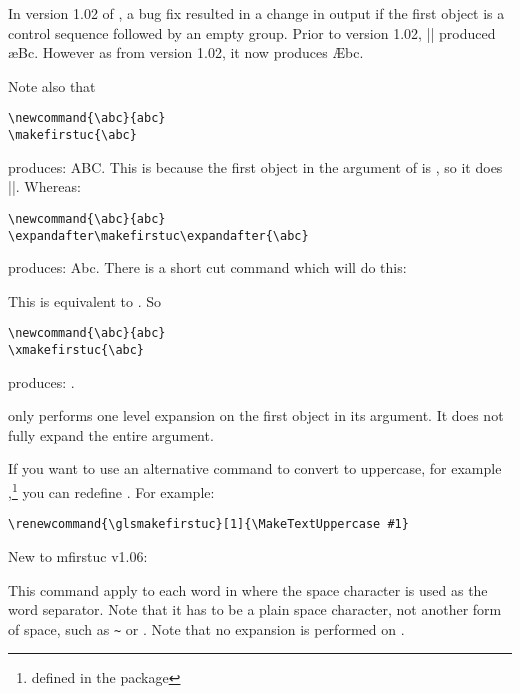 \documentclass{nlctdoc}
\begin{document}
\begin{important}
In version 1.02 of , a bug fix resulted in a change
in output if the first object is a control sequence followed by
an empty group. Prior to version 1.02, ||
produced \ae Bc. However as from version 1.02, it now produces
\AE bc.
\end{important}

Note also that
\begin{verbatim}
\newcommand{\abc}{abc}
\makefirstuc{\abc}
\end{verbatim}
produces: ABC. This is because the first object in the argument of
 is , so it does |\MakeUppercase{\abc}|.
Whereas:
\begin{verbatim}
\newcommand{\abc}{abc}
\expandafter\makefirstuc\expandafter{\abc}
\end{verbatim}
produces: Abc. There is a short cut command which will do this:
\begin{definition}[\DescribeMacro{\xmakefirstuc}]
\end{definition}
This is equivalent to . So
\begin{verbatim}
\newcommand{\abc}{abc}
\xmakefirstuc{\abc}
\end{verbatim}
produces: 
\newcommand{\abc}{abc}%
\xmakefirstuc{\abc}.

\begin{important}
 only performs one level expansion on the first
object in its argument. It does not fully expand the entire
argument.
\end{important}

If you want to use an alternative command to convert to uppercase,
for example ,\footnote{defined in the 
 package} you can redefine . 
For example:
\begin{verbatim}
\renewcommand{\glsmakefirstuc}[1]{\MakeTextUppercase #1}
\end{verbatim}

New to mfirstuc v1.06:
\begin{definition}[\DescribeMacro{\capitalisewords}]
\end{definition}
This command apply  to each word in 
where the space character is used as the word separator. Note that
it has to be a plain space character, not another form of space,
such as \verb|~| or . Note that no expansion is performed
on .
\end{document}
